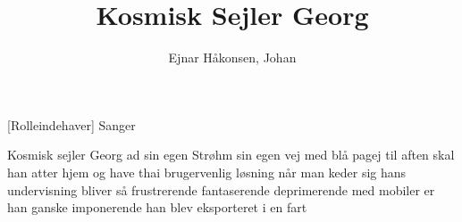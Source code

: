 \documentclass[a4paper,11pt]{article}
\title{Kosmisk Sejler Georg}
\author{Ejnar Håkonsen, Johan}
\begin{document}
\maketitle

\begin{roles}  
[Rolleindehaver] Sanger
\end{roles}

\begin{song}
   Kosmisk sejler Georg ad sin egen Strøhm
sin egen vej
med blå pagej
til aften skal han atter hjem og have thai
brugervenlig løsning når man keder sig
hans undervisning bliver så frustrerende
fantaserende
deprimerende
med mobiler er han ganske imponerende
han blev eksporteret i en fart
\end{song}
\end{document}
